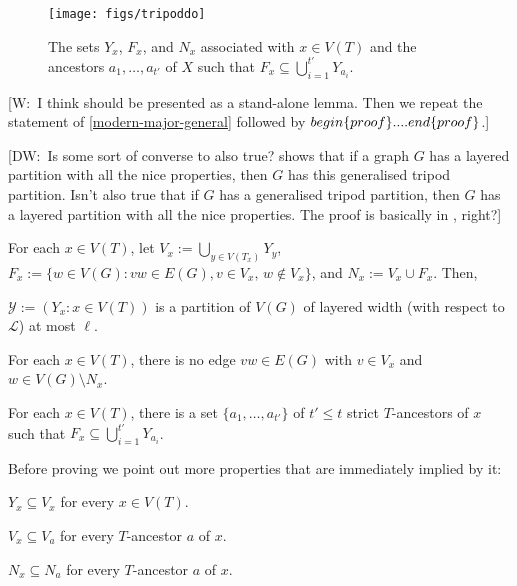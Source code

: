 \documentclass{patmorin}
\newcommand{\note}[2]{{\color{red}[#1:~#2]}}
\newcommand{\ylabel}[1]{\label{y:#1}}
\renewcommand{\le}{\leqslant}
\begin{document}
\begin{figure}
  \begin{center}
    \texttt{[image: figs/tripoddo]}
  \end{center}
  \caption{The sets $Y_x$, $F_x$, and $N_x$ associated with $x\in V(T)$
  and the ancestors $a_1,\ldots,a_{t'}$ of $X$ such that $F_x \subseteq \bigcup_{i=1}^{t'} Y_{a_i}$.}
  \label{fig:generalized-tripod}
\end{figure}

\note{W}{I think  should be presented as a stand-alone lemma. Then we repeat the statement of \cref{modern-major-general} followed by $\\begin \{proof\} .... \\end\{proof\}$.}

\note{DW}{Is some sort of converse to \clmref{generalized-tripod}  also true? \clmref{generalized-tripod}  shows that if a graph $G$ has a layered partition with all the nice properties, then $G$ has this generalised tripod partition. Isn't also true that if $G$ has a generalised tripod partition, then $G$ has a layered partition with all the nice properties. The proof is basically in \citep{dujmovic.joret.ea:planar}, right?}

\begin{clm}
  For each $x\in V(T)$, let $V_x := \bigcup_{y\in V(T_x)} Y_y$, $F_x:=\{w\in V(G): vw\in E(G), v\in V_x,\, w\not\in V_x\}$, and $N_x:=V_x\cup F_x$.  Then, 
  \begin{compactenum}[(Y1)]
    \item\ylabel{thickness} $\mathcal{Y}:=(Y_x: x\in V(T))$ is a partition of $V(G)$ of layered width (with respect to $\mathcal{L}$) at most $\ell$.
    \item\ylabel{separator} For each $x\in V(T)$, there is no edge $vw\in E(G)$ with $v\in V_x$ and $w\in V(G)\setminus N_x$. 
    \item\ylabel{ancestor-edge} For each $x\in V(T)$, there is a set $\{a_1,\ldots,a_{t'}\}$ of $t'\le t$ strict $T$-ancestors of $x$ such that $F_x \subseteq \bigcup_{i=1}^{t'} Y_{a_i}$.
  \end{compactenum}
\end{clm}

Before proving  we point out more properties that are immediately implied by it:

\begin{compactenum}[(Y1)]\setcounter{enumi}{3}
  \item\ylabel{y-subsets} $Y_x\subseteq V_x$ for every $x\in V(T)$. 
  \item\ylabel{containment-i} $V_x\subseteq V_a$ for every $T$-ancestor $a$ of $x$. 
  \item\ylabel{containment-ii}$N_x\subseteq N_a$ for every $T$-ancestor $a$ of $x$.
\end{compactenum}
\end{document}
